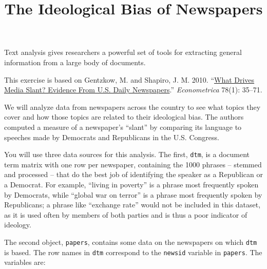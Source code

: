 \documentclass[]{article}
\title{The Ideological Bias of Newspapers}
\author{}
\date{}
\begin{document}
\maketitle


Text analysis gives researchers a powerful set of tools for extracting
general information from a large body of documents.

This exercise is based on Gentzkow, M. and Shapiro, J. M. 2010.
``\href{http://dx.doi.org/10.3982/ECTA7195}{What Drives Media Slant?
Evidence From U.S. Daily Newspapers}.'' \emph{Econometrica} 78(1):
35--71.

We will analyze data from newspapers across the country to see what
topics they cover and how those topics are related to their ideological
bias. The authors computed a measure of a newspaper's ``slant'' by
comparing its language to speeches made by Democrats and Republicans in
the U.S. Congress.

You will use three data sources for this analysis. The first,
\texttt{dtm}, is a document term matrix with one row per newspaper,
containing the 1000 phrases -- stemmed and processed -- that do the best
job of identifying the speaker as a Republican or a Democrat. For
example, ``living in poverty'' is a phrase most frequently spoken by
Democrats, while ``global war on terror'' is a phrase most frequently
spoken by Republicans; a phrase like ``exchange rate'' would not be
included in this dataset, as it is used often by members of both parties
and is thus a poor indicator of ideology.

The second object, \texttt{papers}, contains some data on the newspapers
on which \texttt{dtm} is based. The row names in \texttt{dtm} correspond
to the \texttt{newsid} variable in \texttt{papers}. The variables are:
\end{document}
